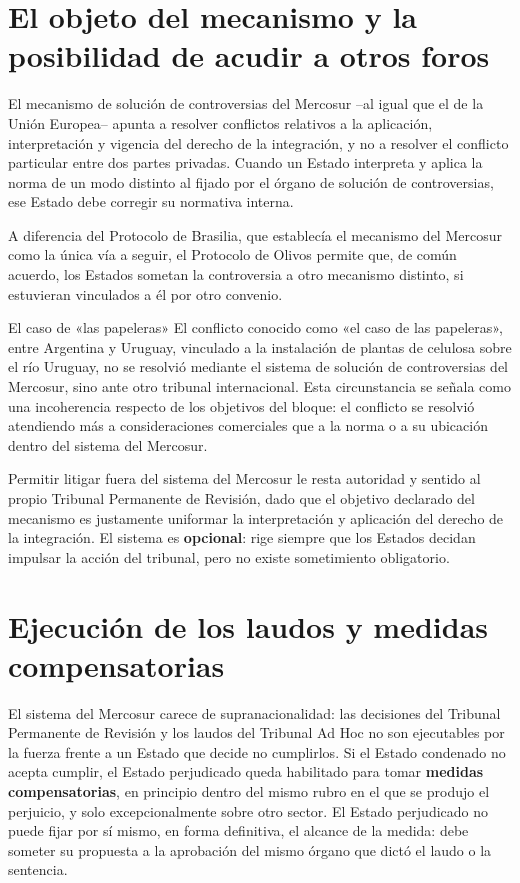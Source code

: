 \documentclass[12pt,oneside]{book}
\begin{document}
\section{El objeto del mecanismo y la posibilidad de acudir a otros foros}

El mecanismo de solución de controversias del Mercosur --al igual que el de la Unión Europea-- apunta a resolver conflictos relativos a la aplicación, interpretación y vigencia del derecho de la integración, y no a resolver el conflicto particular entre dos partes privadas. Cuando un Estado interpreta y aplica la norma de un modo distinto al fijado por el órgano de solución de controversias, ese Estado debe corregir su normativa interna.

A diferencia del Protocolo de Brasilia, que establecía el mecanismo del Mercosur como la única vía a seguir, el Protocolo de Olivos permite que, de común acuerdo, los Estados sometan la controversia a otro mecanismo distinto, si estuvieran vinculados a él por otro convenio.

\begin{ejemplo}{El caso de «las papeleras»}
El conflicto conocido como «el caso de las papeleras», entre Argentina y Uruguay, vinculado a la instalación de plantas de celulosa sobre el río Uruguay, no se resolvió mediante el sistema de solución de controversias del Mercosur, sino ante otro tribunal internacional. Esta circunstancia se señala como una incoherencia respecto de los objetivos del bloque: el conflicto se resolvió atendiendo más a consideraciones comerciales que a la norma o a su ubicación dentro del sistema del Mercosur.
\end{ejemplo}

\begin{importante}
Permitir litigar fuera del sistema del Mercosur le resta autoridad y sentido al propio Tribunal Permanente de Revisión, dado que el objetivo declarado del mecanismo es justamente uniformar la interpretación y aplicación del derecho de la integración. El sistema es \textbf{opcional}: rige siempre que los Estados decidan impulsar la acción del tribunal, pero no existe sometimiento obligatorio.
\end{importante}

\section{Ejecución de los laudos y medidas compensatorias}

El sistema del Mercosur carece de supranacionalidad: las decisiones del Tribunal Permanente de Revisión y los laudos del Tribunal Ad Hoc no son ejecutables por la fuerza frente a un Estado que decide no cumplirlos. Si el Estado condenado no acepta cumplir, el Estado perjudicado queda habilitado para tomar \textbf{medidas compensatorias}, en principio dentro del mismo rubro en el que se produjo el perjuicio, y solo excepcionalmente sobre otro sector. El Estado perjudicado no puede fijar por sí mismo, en forma definitiva, el alcance de la medida: debe someter su propuesta a la aprobación del mismo órgano que dictó el laudo o la sentencia.
\end{document}
